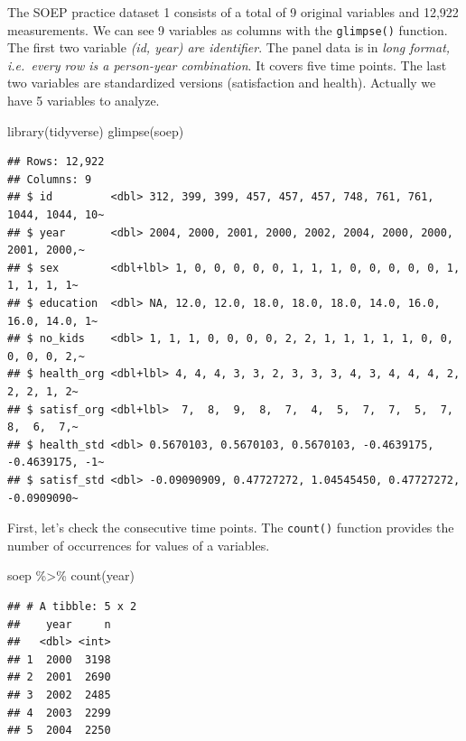 \documentclass[
]{book}
\newenvironment{Shaded}{\begin{snugshade}}{\end{snugshade}}
\newcommand{\FunctionTok}[1]{\textcolor[rgb]{0.00,0.00,0.00}{#1}}
\newcommand{\NormalTok}[1]{#1}
\newcommand{\SpecialCharTok}[1]{\textcolor[rgb]{0.00,0.00,0.00}{#1}}
\begin{document}
The SOEP practice dataset 1 consists of a total of 9 original variables and 12,922 measurements. We can see 9 variables as columns with the \texttt{glimpse()} function. The first two variable \emph{(id, year) are identifier}. The panel data is in \emph{long format, i.e.~every row is a person-year combination}. It covers five time points. The last two variables are standardized versions (satisfaction and health). Actually we have 5 variables to analyze.

\begin{Shaded}
\begin{Highlighting}[]
\FunctionTok{library}\NormalTok{(tidyverse)}
\FunctionTok{glimpse}\NormalTok{(soep)}
\end{Highlighting}
\end{Shaded}

\begin{verbatim}
## Rows: 12,922
## Columns: 9
## $ id         <dbl> 312, 399, 399, 457, 457, 457, 748, 761, 761, 1044, 1044, 10~
## $ year       <dbl> 2004, 2000, 2001, 2000, 2002, 2004, 2000, 2000, 2001, 2000,~
## $ sex        <dbl+lbl> 1, 0, 0, 0, 0, 0, 1, 1, 1, 0, 0, 0, 0, 0, 1, 1, 1, 1, 1~
## $ education  <dbl> NA, 12.0, 12.0, 18.0, 18.0, 18.0, 14.0, 16.0, 16.0, 14.0, 1~
## $ no_kids    <dbl> 1, 1, 1, 0, 0, 0, 0, 2, 2, 1, 1, 1, 1, 1, 0, 0, 0, 0, 0, 2,~
## $ health_org <dbl+lbl> 4, 4, 4, 3, 3, 2, 3, 3, 3, 4, 3, 4, 4, 4, 2, 2, 2, 1, 2~
## $ satisf_org <dbl+lbl>  7,  8,  9,  8,  7,  4,  5,  7,  7,  5,  7,  8,  6,  7,~
## $ health_std <dbl> 0.5670103, 0.5670103, 0.5670103, -0.4639175, -0.4639175, -1~
## $ satisf_std <dbl> -0.09090909, 0.47727272, 1.04545450, 0.47727272, -0.0909090~
\end{verbatim}

First, let's check the consecutive time points. The \texttt{count()} function provides the number of occurrences for values of a variables.

\begin{Shaded}
\begin{Highlighting}[]
\NormalTok{soep }\SpecialCharTok{\%\textgreater{}\%}
  \FunctionTok{count}\NormalTok{(year)}
\end{Highlighting}
\end{Shaded}

\begin{verbatim}
## # A tibble: 5 x 2
##    year     n
##   <dbl> <int>
## 1  2000  3198
## 2  2001  2690
## 3  2002  2485
## 4  2003  2299
## 5  2004  2250
\end{verbatim}
\end{document}

